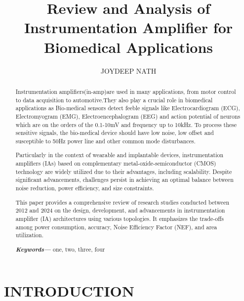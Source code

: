 \documentclass[]{article}
\title{Review and Analysis of Instrumentation Amplifier for Biomedical  Applications}
\author{JOYDEEP NATH}
\affil{Department of Electronics and Communication Engineering(ECE),Assam University Silchar,Assam,India}
\providecommand{\keywords}[1]
{
	\small	
	\textbf{\textit{Keywords---}} #1
}
\begin{document}
\nocite{*} %
\maketitle


\begin{abstract}
	
		Instrumentation amplifiers(in-amp)are used in many applications,
		from motor control to data acquisition to automotive.They also play a crucial role in biomedical applications as Bio-medical sensors detect feeble signals like Electrocardiogram (ECG), Electromyogram (EMG), Electroencephalogram (EEG) and action potential of neurons which are on the orders of the 0.1-10mV and frequency up to 10kHz.
		To process these sensitive signals, the bio-medical device should have low noise, low offset and susceptible to 50Hz power line and other common mode disturbances.
		
	    Particularly in the context of wearable and implantable devices, instrumentation amplifiers (IAs) based on complementary metal-oxide-semiconductor (CMOS) technology are widely utilized due to their advantages, including scalability. Despite significant advancements, challenges persist in achieving an optimal balance between noise reduction, power efficiency, and size constraints.
	  
		This paper provides a comprehensive review of research studies conducted between 2012 and 2024 on the design, development, and advancements in instrumentation amplifier (IA) architectures using various topologies. It emphasizes the trade-offs among power consumption, accuracy, Noise Efficiency Factor (NEF), and area utilization.

\keywords{one, two, three, four}
\end{abstract}
\vspace{4cm}


\section{INTRODUCTION}
\end{document}
